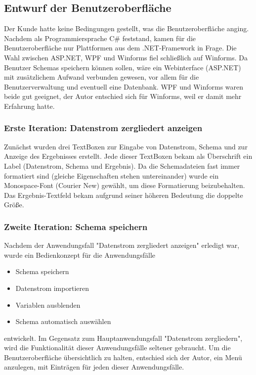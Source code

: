 \subsection{Entwurf der Benutzeroberfläche}
\label{sec:Benutzeroberflaeche}
Der Kunde hatte keine Bedingungen gestellt, was die Benutzeroberfläche anging.
Nachdem als Programmiersprache C\# feststand, kamen für die Benutzeroberfläche nur  Plattformen aus dem .NET-Framework in Frage. Die Wahl zwischen ASP.NET, WPF und Winforms fiel schließlich auf Winforms. Da Benutzer Schemas speichern können sollen, wäre ein Webinterface (ASP.NET) mit zusätzlichem Aufwand verbunden gewesen, vor allem für die Benutzerverwaltung und eventuell eine Datenbank. WPF und Winforms waren beide gut geeignet, der Autor entschied sich für Winforms, weil er damit mehr Erfahrung hatte.

\subsubsection{Erste Iteration: Datenstrom zergliedert anzeigen}
\label{sec:BenutzeroberflaecheZergliedern}
Zunächst wurden drei TextBoxen zur Eingabe von Datenstrom, Schema und zur Anzeige des Ergebnisses erstellt. Jede dieser TextBoxen bekam als Überschrift ein Label (Datenstrom, Schema und Ergebnis). Da die Schemadateien fast immer formatiert sind (gleiche Eigenschaften stehen untereinander) wurde ein Monospace-Font (Courier New) gewählt, um diese Formatierung beizubehalten. Das Ergebnis-Textfeld bekam aufgrund seiner höheren Bedeutung die doppelte Größe.

\subsubsection{Zweite Iteration: Schema speichern}
\label{BenutzeroberflaecheSpeichern}
Nachdem der Anwendungsfall "Datenstrom zergliedert anzeigen" erledigt war, wurde ein Bedienkonzept für die Anwendungsfälle
\begin{itemize}
\item Schema speichern
\item Datenstrom importieren
\item Variablen ausblenden
\item Schema automatisch auswählen
\end{itemize}
entwickelt. Im Gegensatz zum Hauptanwendungsfall "Datenstrom zergliedern", wird die Funktionalität dieser Anwendungsfälle seltener gebraucht. Um die Benutzeroberfläche übersichtlich zu halten, entschied sich der Autor, ein Menü anzulegen, mit Einträgen für jeden dieser Anwendungsfälle.

